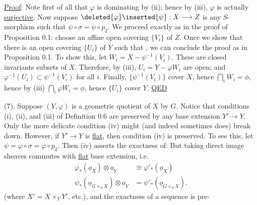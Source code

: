 \uline{Proof}: Note first of all that $\varphi$ is dominating by (ii); hence by (iii), $\varphi$ is actually \uline{surjective}. Now suppose $\deleted{\varphi}\inserted{\psi}:X\longrightarrow Z$ is any $S$-morphism such that $\psi\circ\sigma=\psi\circ p_2$. We proceed exactly as in the proof of Proposition 0.1: choose an affine open covering $\{V_i\}$ of $Z$. Once we show that there is an open covering $\{U_i\}$ of $Y$ such that
,
we can conclude the proof as in Proposition 0.1. To show this, let $W_i=X-\psi^{-1}(V_i)$. These are closed invariants subsets of $X$. Therefore, by (iii), $U_i=Y-\varphi W_i$ are open; and $\varphi^{-1}(U_i)\subset\psi^{-1}(V_i)$ for all $i$. Finally, $\{\psi^{-1}(V_i)\}$ cover $X$, hence $\bigcap_iW_i=\phi$, hence by (iii) $\bigcap_i\varphi W_i=\phi$, hence $\{U_i\}$ cover $Y$. \uline{QED}

(7). Suppose $(Y,\varphi)$ is a geometric quotient of $X$ by $G$. Notice that conditions (i), (ii), and (iii) of Definition 0.6 are preserved by any base extension $Y'\to Y$. Only the more delicate condition (iv) might (and indeed sometimes does) break down. However, if $Y'\longrightarrow Y$ is \uline{flat}, then condition (iv) is preserved. To see this, let $\psi=\varphi\circ\sigma=\varphi\circ p_2$. Then (iv) asserts the exactness of:
But taking direct image sheaves commutes with \uline{flat} base extension, i.e.
\[
\begin{aligned}
\varphi_*(\underline o_X)\otimes\underline o_Y&\cong\varphi'_*(\underline o_X)\\
\psi_*(\underline o_{G\times_S X})\otimes\underline o_Y&=\psi'_*(\underline o_{G\times_S X}).
\end{aligned}
\]
(where $X'=X\times_Y Y'$, etc.), and the exactness of a sequence is pre-
